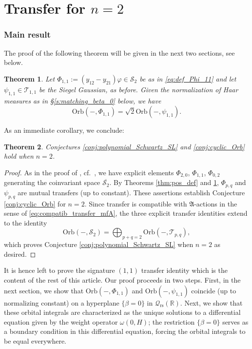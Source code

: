 \documentclass[reqno, 11pt]{amsart} %
\numberwithin{equation}{section}
\theoremstyle{plain}
\newtheorem{theorem}{Theorem}[section]
\theoremstyle{definition}
\theoremstyle{remark}
\newcommand{\mr}{\mathrm}
\newcommand{\mcS}{\mathcal{S}}
\newcommand{\mcT}{\mathcal{T}}
\newcommand{\mfA}{\mathfrak{A}}
\newcommand{\rs}{\mr{rs}}
\newcommand{\bbR}{\mathbb R}
\newcommand{\calQ}{\mathcal Q}
\newcommand{\Orb}{\mathrm{Orb}}
\begin{document}
\part{Transfer for $n = 2$}
\section{Main result}
\label{s:transfer_main}
The proof of the following theorem will be given in the next two sections, see  below.
\begin{theorem}\label{thm:main_signature_11}
Let $
\Phi_{1,1} :=	 (y_{12}-y_{21})φ\in \mcS_2$ be as in \eqref{eq:def_Phi_11} and let  $ ψ_{1,1}\in \mcT_{1,1}$ be the Siegel Gaussian, as before. Given the normalization of Haar measures as in \S\ref{s:matching_beta_0} below, we have
\[
\Orb( - , \Phi_{1,1}) = \sqrt 2 \Orb(-, \psi_{1,1}).
\]
\end{theorem}

As an immediate corollary, we conclude:
\begin{theorem}\label{thm:main_direct_sum}
Conjectures \ref{conj:polynomial_Schwartz_SL} and \ref{conj:cyclic_Orb}  hold when $n = 2$.
\end{theorem}
\begin{proof}
As in the proof of , cf.\ , we have explicit elements $\Phi_{2,0}$, $\Phi_{1,1}$, $\Phi_{0,2}$ generating the coinvariant space $\overline{\mathcal S_2}$. By Theorems \ref{thm:pos_def} and \ref{thm:main_signature_11}, $Φ_{p,q}$ and $ψ_{p,q}$ are mutual transfers (up to constant).
These assertions establish Conjecture \ref{conj:cyclic_Orb} for $n=2$.
Since transfer is compatible with $\mfA$-actions in the sense of \eqref{eq:compatib_transfer_mfA}, the three explicit transfer identities extend to the identity
$$\Orb(-,\mcS_2) = \bigoplus_{p+q = 2} \Orb(-,\mcT_{p,q}),$$
which proves Conjecture \ref{conj:polynomial_Schwartz_SL} when $n = 2$ as desired.
\end{proof}

It is hence left to prove the signature $(1,1)$ transfer identity which is the content of the rest of this article. Our proof proceeds in two steps. First, in the next section, we show that $\Orb(-,\Phi_{1,1})$ and $\Orb(-,\psi_{1,1})$ coincide (up to normalizing constant) on a hyperplane $\{\beta = 0\}$ in $\calQ_\rs(\bbR)$. Next, we show that these orbital integrals are characterized as the unique solutions to a differential equation given by the weight operator $ω(0,H)$; the restriction $\{ \beta =0\}$ serves as a boundary condition in this differential equation, forcing the orbital integrals to be equal everywhere.
\end{document}
